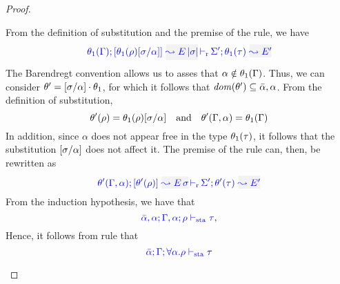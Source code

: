 \begin{proof}
\begin{description}
From the definition of substitution and the premise of the rule, we have
\begin{equation*}
  \dmres{\theta_1(\tenv)}{\theta_1(\rulet)[\suty/\alpha]}{\mmapp{E}{\etrans{\suty}}}{\theta_1(\type)}{E'}{\Sigma'}
\end{equation*}
The Barendregt convention allows us to asses that $\alpha\notin\theta_1(\Gamma)$. Thus, we can
consider $\theta'=[\sigma/\alpha]\cdot\theta_1$, for which it follows that
${\it dom }{(\theta')}\subseteq\bar\alpha,\alpha$. From the definition of substitution,
\begin{equation*}
  \theta'(\rho) = \theta_1(\rho)[\sigma/\alpha]\quad\text{and}\quad
  \theta'(\Gamma,\alpha) = \theta_1(\Gamma)
\end{equation*}
In addition, since $\alpha$ does not appear free in the type $\theta_1(\tau)$,
it follows that the substitution $[\sigma/\alpha]$ does not affect it.
The premise of the rule can, then, be rewritten as
\begin{equation*}
  \dmres{\theta'(\tenv,\alpha)}{\theta'(\rulet)}{\mmapp{E}{\suty}}{\theta'(\type)}{E'}{\Sigma'}
\end{equation*}
From the induction hypothesis, we have that
\begin{equation*}
  {\color{blue} \bar\alpha,\alpha; \Gamma,\alpha; \rho\vdash_{\mathrm{sta}}\tau}
,\end{equation*}
Hence, it follows from rule  that
\begin{equation*}
  {\color{blue} \bar\alpha; \Gamma; \forall \alpha.\rho\vdash_{\mathrm{sta}}\tau}
\end{equation*}
\end{description}
\end{proof}

{\centering
{}}

